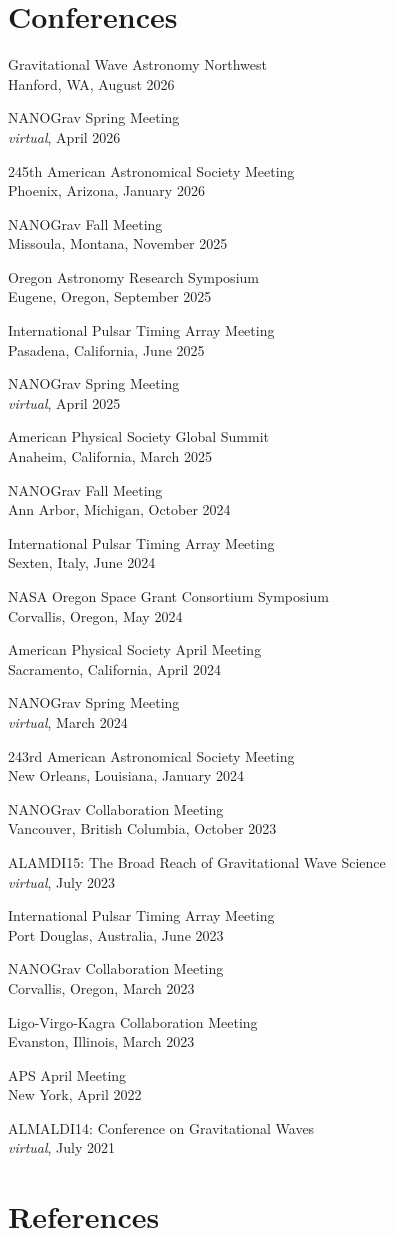 \documentclass[11pt,letterpaper,sans,unicode]{moderncv}
\newcommand{\confitem}[3]{\item {#1}\\{#2}, #3}
\begin{document}
{\section{Conferences}
\begin{etaremune}[leftmargin=8mm]
	\confitem{Gravitational Wave Astronomy Northwest}{Hanford, WA}{August 2026}
	\confitem{NANOGrav Spring Meeting}{\textit{virtual}}{April 2026}
	\confitem{245th American Astronomical Society Meeting}{Phoenix, Arizona}{January 2026}
	\confitem{NANOGrav Fall Meeting}{Missoula, Montana}{November 2025}
	\confitem{Oregon Astronomy Research Symposium}{Eugene, Oregon}{September 2025}
	\confitem{International Pulsar Timing Array Meeting}{Pasadena, California}{June 2025}
	\confitem{NANOGrav Spring Meeting}{\textit{virtual}}{April 2025}
	\confitem{American Physical Society Global Summit}{Anaheim, California}{March 2025}
	\confitem{NANOGrav Fall Meeting}{Ann Arbor, Michigan}{October 2024}
	\confitem{International Pulsar Timing Array Meeting}{Sexten, Italy}{June 2024}
	\confitem{NASA Oregon Space Grant Consortium Symposium}{Corvallis, Oregon}{May 2024}
    \confitem{American Physical Society April Meeting}{Sacramento, California}{April 2024}
    \confitem{NANOGrav Spring Meeting}{\textit{virtual}}{March 2024} 
    \confitem{243rd American Astronomical Society Meeting}{New Orleans, Louisiana}{January 2024}
	\confitem{NANOGrav Collaboration Meeting}{Vancouver, British Columbia}{October 2023}
    \confitem{ALAMDI15: The Broad Reach of Gravitational Wave Science}{\textit{virtual}}{July 2023}
    \confitem{International Pulsar Timing Array Meeting}{Port Douglas, Australia}{June 2023}
    \confitem{NANOGrav Collaboration Meeting}{Corvallis, Oregon}{March 2023}
    \confitem{Ligo-Virgo-Kagra Collaboration Meeting}{Evanston, Illinois}{March 2023}
    \confitem{APS April Meeting}{New York}{April 2022}
    \confitem{ALMALDI14: Conference on Gravitational Waves}{\textit{virtual}}{July 2021}
\end{etaremune}

\section{References}

}
\end{document}
